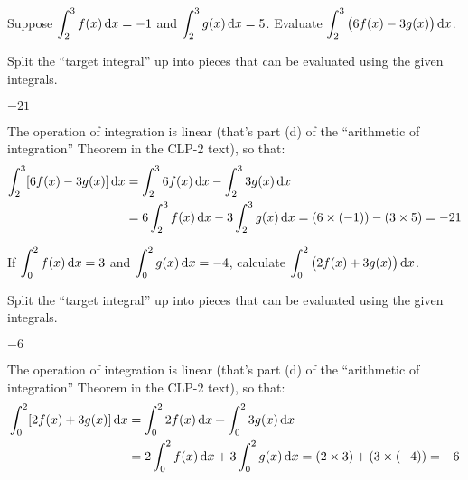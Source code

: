 \subsection*{\Procedural}

\begin{question}[M105 2015A]
Suppose $\displaystyle\int_2^3 f(x)\,\mathrm{d}x = -1$ and
$\displaystyle\int_2^3 g(x)\,\mathrm{d}x = 5$. Evaluate
$\displaystyle \int_2^3 \big( 6 f(x) - 3 g(x) \big)\,\mathrm{d}x$.
\end{question}

\begin{hint}
Split the ``target integral'' up into pieces that can be evaluated using the given integrals.
\end{hint}

\begin{answer}
$-21$
\end{answer}

\begin{solution}
The operation of integration is linear (that's
part (d) of the ``arithmetic of integration''
Theorem   in the CLP-2 text),
so that:
\begin{align*}
\int_2^3 [6 f(x) -3 g(x)]\,\mathrm{d}x
&= \int_2^3 6 f(x)\,\mathrm{d}x  - \int_2^3 3 g(x)\,\mathrm{d}x \\
&= 6 \int_2^3  f(x)\,\mathrm{d}x  - 3\int_2^3 g(x)\,\mathrm{d}x
= (6 \times (-1)) - (3 \times 5)
= -21
\end{align*}

\end{solution}


\begin{question}[2016Q1]
If $\displaystyle\int_0^2 f(x)\,\mathrm{d}x = 3$ and
$\displaystyle\int_0^2 g(x)\,\mathrm{d}x = -4$, calculate
$\displaystyle \int_0^2 \big( 2 f(x) + 3 g(x) \big)\,\mathrm{d}x$.
\end{question}

\begin{hint}
Split the ``target integral'' up into pieces that can be evaluated using the given integrals.
\end{hint}

\begin{answer}
$-6$
\end{answer}

\begin{solution}
The operation of integration is linear (that's
part (d) of the ``arithmetic of integration''
Theorem   in the CLP-2 text),
so that:
\begin{align*}
\int_0^2 [2 f(x) +3 g(x)]\,\mathrm{d}x
   &= \int_0^2 2 f(x)\,\mathrm{d}x  + \int_0^2 3 g(x)\,\mathrm{d}x \\
&= 2 \int_0^2  f(x)\,\mathrm{d}x  + 3\int_0^2 g(x)\,\mathrm{d}x = (2 \times 3) + (3 \times (-4)) = -6
\end{align*}

\end{solution}


